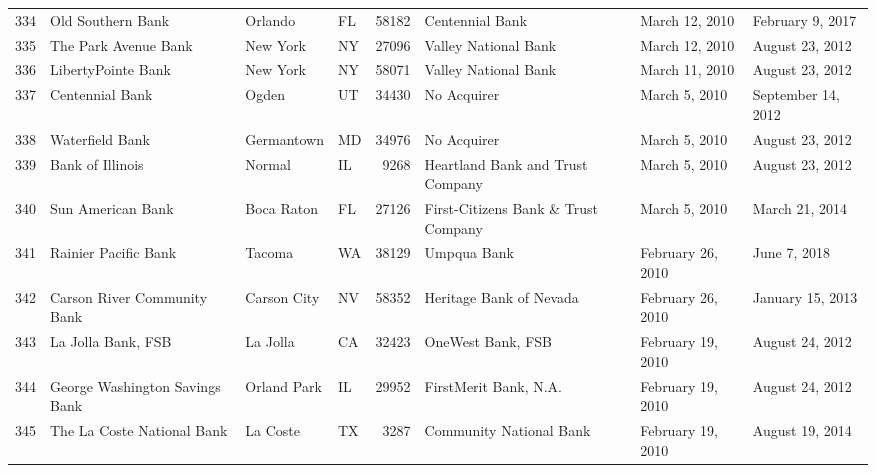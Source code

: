 \begin{tabular}{llllrlll}
334 &                                  Old Southern Bank &             Orlando &  FL &  58182 &                                    Centennial Bank &      March 12, 2010 &    February 9, 2017 \\
335 &                               The Park Avenue Bank &            New York &  NY &  27096 &                               Valley National Bank &      March 12, 2010 &     August 23, 2012 \\
336 &                                 LibertyPointe Bank &            New York &  NY &  58071 &                               Valley National Bank &      March 11, 2010 &     August 23, 2012 \\
337 &                                    Centennial Bank &               Ogden &  UT &  34430 &                                        No Acquirer &       March 5, 2010 &  September 14, 2012 \\
338 &                                    Waterfield Bank &          Germantown &  MD &  34976 &                                        No Acquirer &       March 5, 2010 &     August 23, 2012 \\
339 &                                   Bank of Illinois &              Normal &  IL &   9268 &                   Heartland Bank and Trust Company &       March 5, 2010 &     August 23, 2012 \\
340 &                                  Sun American Bank &          Boca Raton &  FL &  27126 &                First-Citizens Bank \& Trust Company &       March 5, 2010 &      March 21, 2014 \\
341 &                               Rainier Pacific Bank &              Tacoma &  WA &  38129 &                                        Umpqua Bank &   February 26, 2010 &        June 7, 2018 \\
342 &                        Carson River Community Bank &         Carson City &  NV &  58352 &                            Heritage Bank of Nevada &   February 26, 2010 &    January 15, 2013 \\
343 &                                 La Jolla Bank, FSB &            La Jolla &  CA &  32423 &                                  OneWest Bank, FSB &   February 19, 2010 &     August 24, 2012 \\
344 &                     George Washington Savings Bank &         Orland Park &  IL &  29952 &                              FirstMerit Bank, N.A. &   February 19, 2010 &     August 24, 2012 \\
345 &                         The La Coste National Bank &            La Coste &  TX &   3287 &                            Community National Bank &   February 19, 2010 &     August 19, 2014 \\

\end{tabular}
